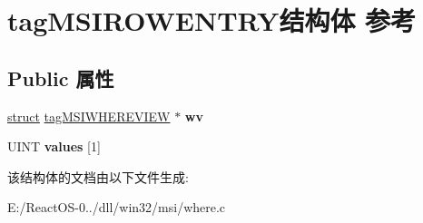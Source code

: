 \hypertarget{structtag_m_s_i_r_o_w_e_n_t_r_y}{}\section{tag\+M\+S\+I\+R\+O\+W\+E\+N\+T\+R\+Y结构体 参考}
\label{structtag_m_s_i_r_o_w_e_n_t_r_y}
\subsection*{Public 属性}
\begin{DoxyCompactItemize}
\item 
\mbox{\label{structtag_m_s_i_r_o_w_e_n_t_r_y_a703a05c2438817301247ff0d19660efb}} 
\hyperlink{interfacestruct}{struct} \hyperlink{structtag_m_s_i_w_h_e_r_e_v_i_e_w}{tag\+M\+S\+I\+W\+H\+E\+R\+E\+V\+I\+EW} $\ast$ {\bfseries wv}
\item 
\mbox{\label{structtag_m_s_i_r_o_w_e_n_t_r_y_a4b17a4f951fad448d073b11c164826b5}} 
U\+I\+NT {\bfseries values} \mbox{[}1\mbox{]}
\end{DoxyCompactItemize}


该结构体的文档由以下文件生成\+:\begin{DoxyCompactItemize}
\item 
E\+:/\+React\+O\+S-\/0../dll/win32/msi/where.\+c\end{DoxyCompactItemize}

